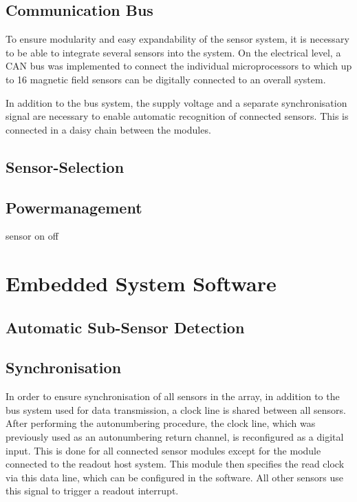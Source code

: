 \documentclass[conference]{IEEEtran}
\begin{document}
\subsection{Communication Bus}
To ensure modularity and easy expandability of the sensor system, it is necessary to be able to integrate several sensors into the system.
On the electrical level, a CAN bus was implemented to connect the individual microprocessors to which up to 16 magnetic field sensors can be digitally connected to an overall system.

In addition to the bus system, the supply voltage and a separate synchronisation signal are necessary to enable automatic recognition of connected sensors. This is connected in a daisy chain between the modules.


\subsection{Sensor-Selection}


\subsection{Powermanagement}
sensor on off


\subsection{}
\section{Embedded System Software}

\subsection{Automatic Sub-Sensor Detection}



\subsection{Synchronisation}

In order to ensure synchronisation of all sensors in the array, in addition to the bus system used for data transmission, a clock line is shared between all sensors.
After performing the autonumbering procedure, the clock line, which was previously used as an autonumbering return channel, is reconfigured as a digital input.
This is done for all connected sensor modules except for the module connected to the readout host system.
This module then specifies the read clock via this data line, which can be configured in the software.
All other sensors use this signal to trigger a readout interrupt.
\end{document}
